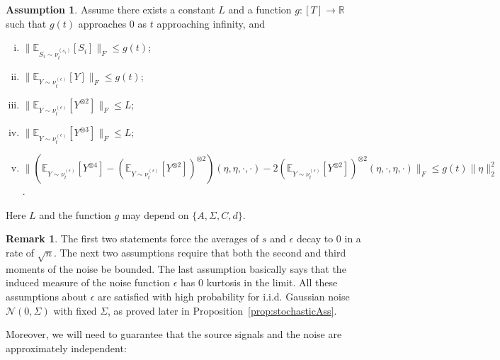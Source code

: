 \documentclass[jmlr]{article}
\newcommand{\E}{\mathbb{E}}
\newcommand{\real}{\mathbb{R}}
\newcommand{\iid}{i.i.d.\xspace}
\theoremstyle{definition}
\newtheorem{remark}[lemma]{Remark}
\newtheorem{assumption}[lemma]{Assumption}
\begin{document}
\begin{assumption}
\label{ass:gauss}
Assume there exists a constant $L$ and a function $g:[T]\rightarrow \real$ such that $g(t)$ approaches 0 as $t$ approaching infinity, and
\begin{enumerate}[(i)]
\vspace{-3mm}
\item $\| \E_{S_i\sim \nu_t^{(s_i)}} [S_i] \|_F\le g(t)$; %
\item $\| \E_{Y \sim \nu_t^{(\epsilon)}} [Y] \|_F \le g(t)$; %
\item $\| \E_{Y\sim \nu_t^{(\epsilon)}} [Y^{\otimes 2}] \|_F \le L$;
\item $\| \E_{Y\sim \nu_t^{(\epsilon)}} [Y^{\otimes 3}] \|_F \le L$;
\item $\| \left(\E_{Y\sim \nu_t^{(\epsilon)}} [Y^{\otimes4}] - (\E_{Y\sim \nu_t^{(\epsilon)}} [Y^{\otimes2}])^{\otimes 2}\right)(\eta,\eta,\cdot,\cdot)  - 2 (\E_{Y\sim \nu_t^{(\epsilon)}} [Y^{\otimes2}])^{\otimes 2}(\eta,\cdot,\eta,\cdot)\|_F\le g(t)\|\eta\|_2^2$. %
\end{enumerate}
Here $L$ and the function $g$ may depend on $\{A,\Sigma,C,d\}$.
\end{assumption}
\begin{remark}
The first two statements force the averages of $s$ and $\epsilon$ decay to 0 in a rate of $\sqrt{n}$.
The next two assumptions require that both the second and third moments of the noise be bounded.
The last assumption basically says that the induced measure of the noise function $\epsilon$ has 0 kurtosis in the limit.
All these assumptions about $\epsilon$ are satisfied with high probability for \iid Gaussian noise $\mathcal{N}(0,\Sigma)$ with fixed $\Sigma$, as proved later in Proposition~\ref{prop:stochasticAss}.
\end{remark}
Moreover, we will need to guarantee that the source signals and the noise are approximately independent:
\end{document}
